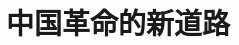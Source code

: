\documentclass[10pt, UTF8]{book} %
\begin{document}









\chapter{中国革命的新道路}
\thispagestyle{empty}
\end{document}

